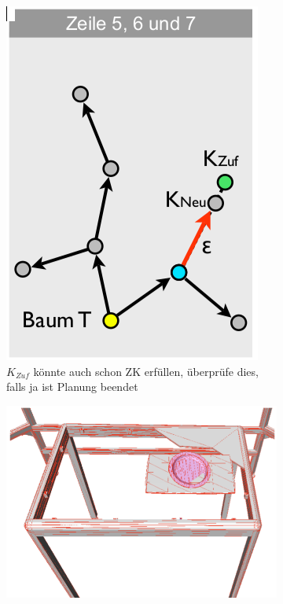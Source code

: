 \begin{figure}[h!]
	\centering
	\begin{subfigure}{.3\textwidth}
		\includegraphics[width=\textwidth]{figures/ch04_Kol.png}
		\caption{$K_{Zuf}$ könnte auch schon ZK erfüllen, überprüfe dies, falls ja ist Planung beendet}
		\label{kol}
	\end{subfigure}
	\begin{subfigure}{.5\textwidth}
		\includegraphics[width=\textwidth]{figures/ch04_Kol1.png}

\end{subfigure}
\end{figure}
